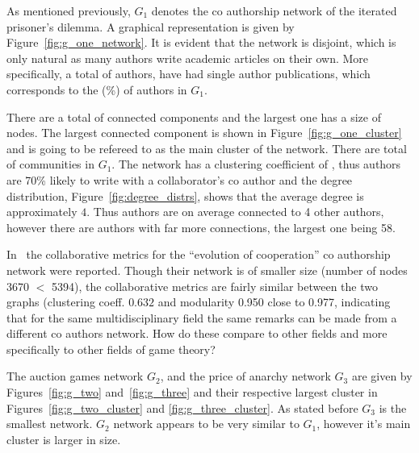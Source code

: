 \documentclass{article}
\theoremstyle{definition}
\newcommand{\isolated}{}
\newcommand{\isolatedpercentage}{}
\newcommand{\connectedcomponents}{}
\newcommand{\communities}{}
\newcommand{\largestcc}{}
\newcommand{\clustering}{}
\begin{document}
As mentioned previously, \(G_1\) denotes the co authorship network of the
iterated prisoner's dilemma. A graphical representation is given by
Figure~\ref{fig:g_one_network}. It is evident that the network is disjoint,
which is only natural as many authors write academic articles on their own. More
specifically, a total of \isolated authors, have had single author publications,
which corresponds to the \isolatedpercentage (\%) of authors in \(G_1\).

There are a total of \connectedcomponents connected components and the largest
one has a size of \largestcc nodes. The largest connected component is shown in
Figure~\ref{fig:g_one_cluster} and is going to be refereed to as the main
cluster of the network. There are total of \communities communities in \(G_1\).
The network has a clustering coefficient of \clustering, thus authors are 70\%
likely to write with a collaborator's co author and the degree distribution,
Figure~\ref{fig:degree_distrs}, shows that the average degree is approximately
\(4\). Thus authors are on average connected to 4 other authors, however there
are authors with far more connections, the largest one being 58.

In~\cite{Liu2015} the collaborative metrics for the ``evolution of cooperation''
co authorship network were reported. Though their network is of smaller size
(number of nodes 3670 \(<\) 5394), the collaborative metrics are fairly similar
between the two graphs (clustering coeff. \(0.632\) and modularity
0.950 close to 0.977, indicating that for the same multidisciplinary field the same
remarks can be made from a different co authors network. How do these compare to other fields
and more specifically to other fields of game theory?

The auction games network \(G_2\), and the price of anarchy network \(G_3\)
are given by Figures~\ref{fig:g_two} and~\ref{fig:g_three} and their respective
largest cluster in Figures~\ref{fig:g_two_cluster} and \ref{fig:g_three_cluster}.
As stated before \(G_3\) is the smallest network. \(G_2\) network appears to be
very similar to \(G_1\), however it's main cluster is larger in size.
\end{document}
